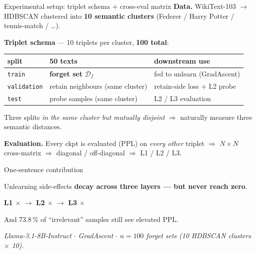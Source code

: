 \documentclass[aspectratio=169,10pt]{beamer}
\begin{document}
\begin{frame}{Experimental setup: triplet schema + cross-eval matrix}
    \textbf{Data.} WikiText-103 $\to$ HDBSCAN clustered into \textbf{10 semantic clusters}
    \scriptsize(Federer / Harry Potter / tennis-match / \dots)\small.

    \vspace{0.4em}
    \textbf{Triplet schema} --- 10 triplets per cluster, \textbf{100 total}:
    \begin{center}
    \footnotesize
    \begin{tabular}{@{}lll@{}}
        \toprule
        split & 50 texts & downstream use \\
        \midrule
        \texttt{train}      & \textbf{forget set} $\mathcal{D}_f$   & fed to unlearn (GradAscent) \\
        \texttt{validation} & retain neighbours (same cluster)      & retain-side loss + L2 probe \\
        \texttt{test}       & probe samples (same cluster)          & L2 / L3 evaluation \\
        \bottomrule
    \end{tabular}
    \end{center}
    \small
    Three splits \emph{in the same cluster but mutually disjoint} $\Rightarrow$ naturally measure three semantic distances.

    \vspace{0.4em}
    \textbf{Evaluation.} Every ckpt is evaluated (PPL) on \emph{every other} triplet
    $\Rightarrow$ $N \!\times\! N$ cross-matrix $\Rightarrow$ diagonal / off-diagonal
    $\Rightarrow$ L1 / L2 / L3.
\end{frame}

\begin{frame}{One-sentence contribution}
    \begin{center}
        \large
        Unlearning side-effects \textbf{decay across three layers --- but never reach zero}.
    \end{center}

    \vspace{0.8em}
    \begin{center}
        \Large
        \textbf{L1 $\times$} \;$\to$\; \textbf{L2 $\times$} \;$\to$\; \textbf{L3 $\times$}
    \end{center}

    \vspace{0.8em}
    \begin{center}
        \normalsize
        And \alert{73.8\,\%} of ``irrelevant'' samples still see elevated PPL.
    \end{center}

    \vfill
    \footnotesize\itshape\centering
    Llama-3.1-8B-Instruct $\cdot$ GradAscent $\cdot$ $n=100$ forget sets (10 HDBSCAN clusters $\times$ 10).
\end{frame}
\end{document}
